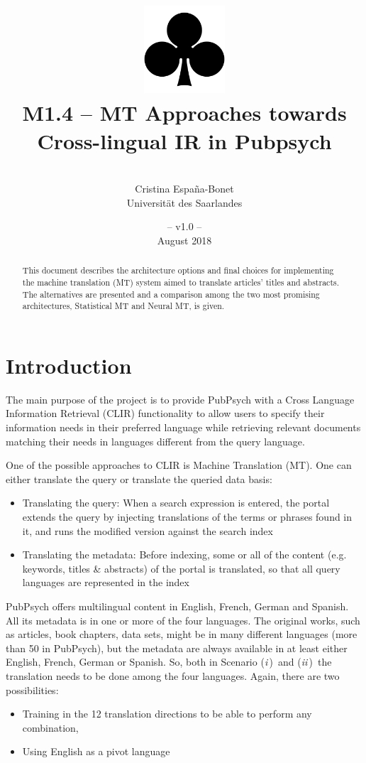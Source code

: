 \documentclass[a4paper,11pt]{article}
\title{
\includegraphics[width=3cm]{./img/200px-SuitClubs.png} \\
\Huge M1.4 -- MT Approaches towards Cross-lingual IR in Pubpsych}
\author{\vspace*{1cm}\\ \LARGE Cristina Espa\~na-Bonet \medskip \\ \Large Universit\"at des Saarlandes}
\date{\vspace*{2cm} -- v1.0 --\\August 2018}
\newcommand{\Ni}{({\em i\,})~}
\newcommand{\Nii}{({\em ii\,})~}
\begin{document}
\clearpage\maketitle
\thispagestyle{empty}\thispagestyle{empty}

\vspace*{5cm}
\begin{abstract}
This document describes the architecture options and final choices for implementing the machine translation (MT) system aimed to translate articles' titles and abstracts. The alternatives are presented and a comparison among the two most promising architectures, Statistical MT and Neural MT, is given. 
\end{abstract}

\newpage
\tableofcontents
\clearpage

\section{Introduction}
\label{s:intro}

The main purpose of the project is to provide PubPsych with a Cross Language Information Retrieval (CLIR) functionality to allow users to specify their information needs in their preferred language while retrieving relevant documents matching their needs in languages different from the query language.

One of the possible approaches to CLIR is Machine Translation (MT). One can either translate the query or translate the queried data basis:

\begin{itemize}
\itemsep0em 
 \item[\Ni] Translating the query: When a search expression is entered, the portal extends the query by injecting translations of the terms or phrases found in it, and runs the modified version against the search index
 \item[\Nii] Translating the metadata: Before indexing, some or all of the content (e.g. keywords, titles \& abstracts) of the portal is translated, so that all query languages are represented in the index
\end{itemize}

PubPsych offers multilingual content in English, French, German and Spanish. All its metadata is in one or more of the four languages. The original works, such as articles, book chapters, data sets, might be in many different languages (more than 50 in PubPsych), but the metadata are always available in at least either English, French, German or Spanish. So, both in Scenario \Ni and \Nii the translation needs to be done among the four languages. Again, there are two possibilities:
\begin{itemize}
\itemsep0em 
 \item[\Ni] Training in the 12 translation directions to be able to perform any combination,
 \item[\Nii] Using English as a pivot language
\end{itemize}
\end{document}
